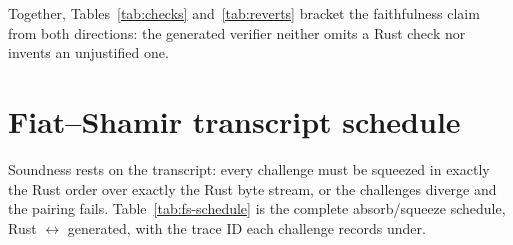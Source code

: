 Together, Tables~\ref{tab:checks} and~\ref{tab:reverts} bracket the
faithfulness claim from both directions: the generated verifier neither
omits a Rust check nor invents an unjustified one.

\section{Fiat--Shamir transcript schedule}
\label{sec:transcript-schedule}

Soundness rests on the transcript: every challenge must be squeezed in
exactly the Rust order over exactly the Rust byte stream, or the
challenges diverge and the pairing fails. Table~\ref{tab:fs-schedule}
is the complete absorb/squeeze schedule, Rust $\leftrightarrow$
generated, with the trace ID each challenge records under.

